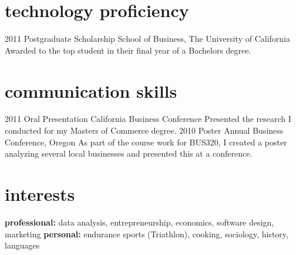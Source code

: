 \documentclass[]{friggeri-cv} %
\begin{document}

\section{technology proficiency}

\begin{entrylist}
\entry
{2011}
{Postgraduate Scholarship}
{School of Business, The University of California}
{Awarded to the top student in their final year of a Bachelors degree.}
\end{entrylist}


\section{communication skills}

\begin{entrylist}
\entry
{2011}
{Oral Presentation}
{California Business Conference}
{Presented the research I conducted for my Masters of Commerce degree.}
\entry
{2010}
{Poster}
{Annual Business Conference, Oregon}
{As part of the course work for BUS320, I created a poster analyzing several local businesses and presented this at a conference.}
\end{entrylist}


\section{interests}

\textbf{professional:} data analysis, entrepreneurship, economics, software design, marketing \textbf{personal:} endurance sports (Triathlon), cooking, sociology, history, languages
\end{document}
